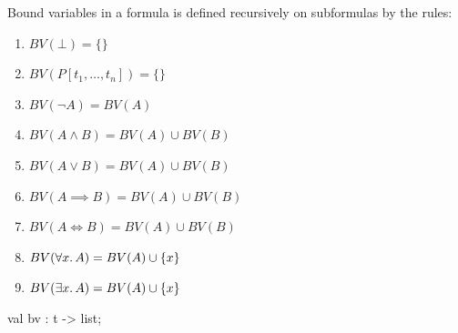 \begin{node}
Bound variables in  a formula is defined recursively on subformulas by
the rules:
\begin{enumerate}
\item $BV(\bot)=\{\}$
\item $BV(P[t_{1},\dots,t_{n}])=\{\}$
\item $BV(\neg A)=BV(A)$
\item $BV(A\land B)=BV(A)\cup BV(B)$
\item $BV(A\lor B)=BV(A)\cup BV(B)$
\item $BV(A\implies B)=BV(A)\cup BV(B)$
\item $BV(A\iff B)=BV(A)\cup BV(B)$
\item $BV(\forall x\ldotp A)=BV(A)\cup\{x\}$
\item $BV(\exists x\ldotp A)=BV(A)\cup\{x\}$
\end{enumerate}
\end{node}
\nwenddocs{}\plusendmoddef\nwstartdeflinemarkup{}\nwenddeflinemarkup
val bv : t ->  list;
\nwendcode{}\nwdocspar

